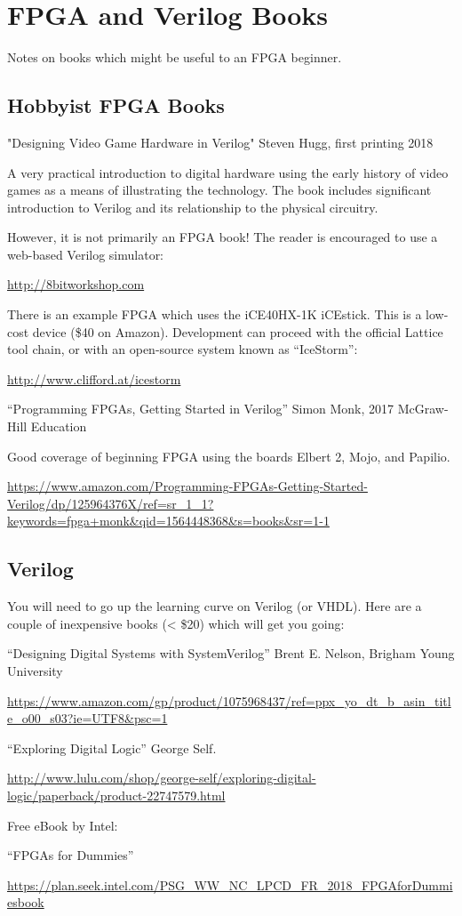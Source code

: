 \section{FPGA and Verilog Books}

Notes on books which might be useful to an FPGA beginner.

\subsection{Hobbyist FPGA Books}

"Designing Video Game Hardware in Verilog"
Steven Hugg, first printing 2018

A very practical introduction to digital hardware using the early history of video games as a means of illustrating the technology.
The book includes significant introduction to Verilog and its relationship to the physical circuitry.

However, it is not primarily an FPGA book!  The reader is encouraged to use a web-based Verilog simulator:

\url{http://8bitworkshop.com}

There is an example FPGA which uses the iCE40HX-1K iCEstick.
This is a low-cost device (\$40 on Amazon).  Development can proceed
with the official Lattice tool chain, or with an open-source system
known as ``IceStorm'':

\url{http://www.clifford.at/icestorm}

``Programming FPGAs, Getting Started in Verilog''
Simon Monk, 2017 McGraw-Hill Education

Good coverage of beginning FPGA using the boards Elbert 2, Mojo, and Papilio.

\url{https://www.amazon.com/Programming-FPGAs-Getting-Started-Verilog/dp/125964376X/ref=sr_1_1?keywords=fpga+monk&qid=1564448368&s=books&sr=1-1}

\subsection{Verilog}

You will need to go up the learning curve on Verilog (or VHDL).
Here are a couple of inexpensive books (< \$20) which will get you going:

``Designing Digital Systems with SystemVerilog''
Brent E. Nelson, Brigham Young University

\url{https://www.amazon.com/gp/product/1075968437/ref=ppx_yo_dt_b_asin_title_o00_s03?ie=UTF8&psc=1}

``Exploring Digital Logic''
George Self.

\url{http://www.lulu.com/shop/george-self/exploring-digital-logic/paperback/product-22747579.html}

Free eBook by Intel:

``FPGAs for Dummies''

\url{https://plan.seek.intel.com/PSG_WW_NC_LPCD_FR_2018_FPGAforDummiesbook}

